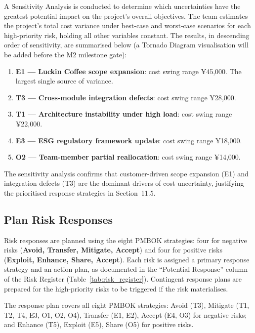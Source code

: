 \documentclass[12pt,a4paper]{article}
\begin{document}
A Sensitivity Analysis is conducted to determine which uncertainties have the greatest potential impact on the project's overall objectives. The team estimates the project's total cost variance under best-case and worst-case scenarios for each high-priority risk, holding all other variables constant. The results, in descending order of sensitivity, are summarised below (a Tornado Diagram visualisation will be added before the M2 milestone gate):

\begin{enumerate}[leftmargin=*]
    \item \textbf{E1 --- Luckin Coffee scope expansion}: cost swing range \textpm¥45{,}000. The largest single source of variance.
    \item \textbf{T3 --- Cross-module integration defects}: cost swing range \textpm¥28{,}000.
    \item \textbf{T1 --- Architecture instability under high load}: cost swing range \textpm¥22{,}000.
    \item \textbf{E3 --- ESG regulatory framework update}: cost swing range \textpm¥18{,}000.
    \item \textbf{O2 --- Team-member partial reallocation}: cost swing range \textpm¥14{,}000.
\end{enumerate}

The sensitivity analysis confirms that customer-driven scope expansion (E1) and integration defects (T3) are the dominant drivers of cost uncertainty, justifying the prioritised response strategies in Section~11.5.

\subsection{Plan Risk Responses}

Risk responses are planned using the eight PMBOK strategies: four for negative risks (\textbf{Avoid, Transfer, Mitigate, Accept}) and four for positive risks (\textbf{Exploit, Enhance, Share, Accept}). Each risk is assigned a primary response strategy and an action plan, as documented in the ``Potential Response'' column of the Risk Register (Table~\ref{tab:risk_register}). Contingent response plans are prepared for the high-priority risks to be triggered if the risk materialises.

The response plan covers all eight PMBOK strategies: Avoid (T3), Mitigate (T1, T2, T4, E3, O1, O2, O4), Transfer (E1, E2), Accept (E4, O3) for negative risks; and Enhance (T5), Exploit (E5), Share (O5) for positive risks.
\end{document}

